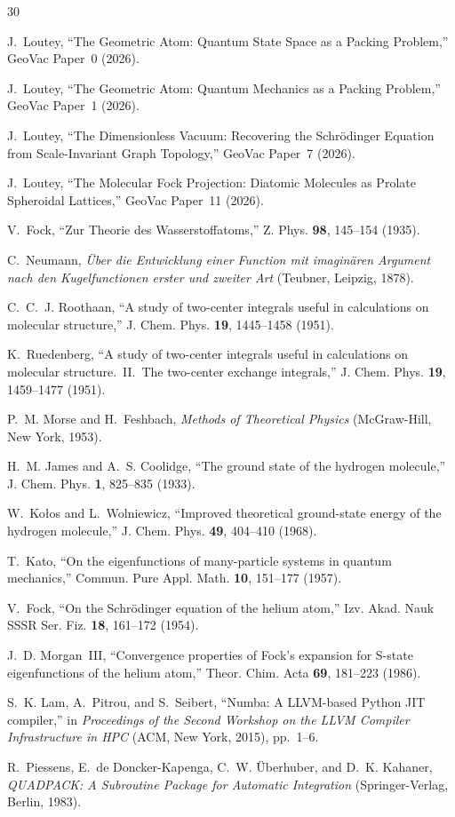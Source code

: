 \documentclass[aps,pra,twocolumn,superscriptaddress,longbibliography]{revtex4-2}
\begin{document}
\begin{thebibliography}{30}

J.~Loutey,
``The Geometric Atom: Quantum State Space as a Packing Problem,''
GeoVac Paper~0 (2026).

J.~Loutey,
``The Geometric Atom: Quantum Mechanics as a Packing Problem,''
GeoVac Paper~1 (2026).

J.~Loutey,
``The Dimensionless Vacuum: Recovering the Schr\"odinger Equation
from Scale-Invariant Graph Topology,''
GeoVac Paper~7 (2026).

J.~Loutey,
``The Molecular Fock Projection: Diatomic Molecules as Prolate
Spheroidal Lattices,''
GeoVac Paper~11 (2026).

V.~Fock,
``Zur Theorie des Wasserstoffatoms,''
Z. Phys. \textbf{98}, 145--154 (1935).

C.~Neumann,
\textit{\"Uber die Entwicklung einer Function mit imagin\"aren
Argument nach den Kugelfunctionen erster und zweiter Art}
(Teubner, Leipzig, 1878).

C.~C.~J. Roothaan,
``A study of two-center integrals useful in calculations on
molecular structure,''
J. Chem. Phys. \textbf{19}, 1445--1458 (1951).

K.~Ruedenberg,
``A study of two-center integrals useful in calculations on
molecular structure.\ II.\ The two-center exchange integrals,''
J. Chem. Phys. \textbf{19}, 1459--1477 (1951).

P.~M. Morse and H.~Feshbach,
\textit{Methods of Theoretical Physics}
(McGraw-Hill, New York, 1953).

H.~M. James and A.~S. Coolidge,
``The ground state of the hydrogen molecule,''
J. Chem. Phys. \textbf{1}, 825--835 (1933).

W.~Ko\l{}os and L.~Wolniewicz,
``Improved theoretical ground-state energy of the hydrogen
molecule,''
J. Chem. Phys. \textbf{49}, 404--410 (1968).

T.~Kato,
``On the eigenfunctions of many-particle systems in quantum
mechanics,''
Commun. Pure Appl. Math. \textbf{10}, 151--177 (1957).

V.~Fock,
``On the Schr\"odinger equation of the helium atom,''
Izv. Akad. Nauk SSSR Ser. Fiz. \textbf{18}, 161--172 (1954).

J.~D. Morgan~III,
``Convergence properties of Fock's expansion for S-state
eigenfunctions of the helium atom,''
Theor. Chim. Acta \textbf{69}, 181--223 (1986).

S.~K. Lam, A.~Pitrou, and S.~Seibert,
``Numba: A LLVM-based Python JIT compiler,''
in \textit{Proceedings of the Second Workshop on the LLVM
Compiler Infrastructure in HPC} (ACM, New York, 2015),
pp.\ 1--6.

R.~Piessens, E.~de Doncker-Kapenga, C.~W. \"Uberhuber,
and D.~K. Kahaner,
\textit{QUADPACK: A Subroutine Package for Automatic Integration}
(Springer-Verlag, Berlin, 1983).

\end{thebibliography}
\end{document}
